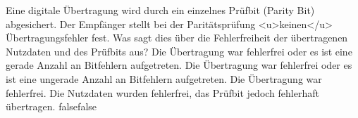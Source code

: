     {Eine digitale Übertragung wird durch ein einzelnes Prüfbit (Parity Bit) abgesichert. Der Empfänger stellt bei der Paritätsprüfung <u>keinen</u> Übertragungsfehler fest. Was sagt dies über die Fehlerfreiheit der übertragenen Nutzdaten und des Prüfbits aus?}
    {Die Übertragung war fehlerfrei oder es ist eine gerade Anzahl an Bitfehlern aufgetreten.}
    {Die Übertragung war fehlerfrei oder es ist eine ungerade Anzahl an Bitfehlern aufgetreten.}
    {Die Übertragung war fehlerfrei.}
    {Die Nutzdaten wurden fehlerfrei, das Prüfbit jedoch fehlerhaft übertragen.}
    {false}{false}